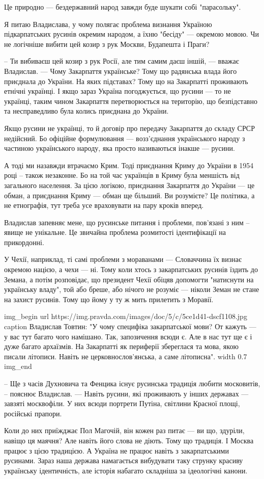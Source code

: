 Це природно --- бездержавний народ завжди буде шукати собі "парасольку".

Я питаю Владислава, у чому полягає проблема визнання Україною підкарпатських
русинів окремим народом, а їхню "бесіду" --- окремою мовою. Чи не логічніше
вибити цей козир з рук Москви, Будапешта і Праги?

– Ти вибиваєш цей козир з рук Росії, але тим самим даєш іншій, --- вважає
Владислав. --- Чому Закарпаття українське? Тому що радянська влада його приєднала
до України. На яких підставах? Тому що на Закарпатті проживають етнічні
українці. І якщо зараз Україна погоджується, що русини --- то не українці, таким
чином Закарпаття перетворюється на територію, що безпідставно та несправедливо
була колись приєднана до України.

Якщо русини не українці, то й договір про передачу Закарпаття до складу СРСР
недійсний. Бо офіційне формулювання --- возз'єднання українського народу з
частиною українського народу, яка просто називаються інакше --- русини. 

А тоді ми назавжди втрачаємо Крим. Тоді приєднання Криму до України в 1954 році
– також незаконне. Бо на той час українців в Криму була меншість від загального
населення. За цією логікою, приєднання Закарпаття до України --- це обман, а
приєднання Криму --- обман ще більший. Ви розумієте? Це політика, а не
етнографія, тут треба усе враховувати на пару кроків вперед.

Владислав запевняє мене, що русинське питання і проблеми, пов’язані з ним –
явище не унікальне. Це звичайна проблема розмитості ідентифікації на
прикордонні.

У Чехії, наприклад, ті самі проблеми з мораванами --- Словаччина їх визнає
окремою нацією, а чехи --- ні. Тому коли хтось з закарпатських русинів їздить до
Земана, а потім розповідає, що президент Чехії обіцяв допомогти "натиснути на
українську владу", той або бреше, або нічого не розуміє --- ніколи Земан не стане
на захист русинів. Тому що йому у ту ж мить прилетить з Моравії.

\ifcmt
img_begin 
        url https://img.pravda.com/images/doc/5/c/5ce1d41-dscf1108.jpg
        caption Владислав Товтин: "У чому специфіка закарпатської мови? От кажуть --- у вас тут багато чого намішано. Так, запозичення всюди є. Але в нас тут ще є і дуже багато архаїзмів. На Закарпатті як периферії збереглася та мова, якою писали літописи. Навіть не церковнослов’янська, а саме літописна".
        width 0.7
img_end
\fi

– Ще з часів Духновича та Фенцика існує русинська традиція любити московитів, –
пояснює Владислав. --- Навіть русини, які проживають у інших державах --- завзяті
москвофіли. У них всюди портрети Путіна, світлини Красної площі, російські
прапори.

Коли до них приїжджає Пол Магочій, він кожен раз питає --- ви що, здуріли, навіщо
ця маячня? Але навіть його слова не діють. Тому що традиція. І Москва працює з
цією традицією. А Україна не працює навіть з закарпатськими русинами. Зараз
наша держава намагається вибудувати таку струнку красиву українську
ідентичність, але історія набагато складніша за ідеологічні канони.

